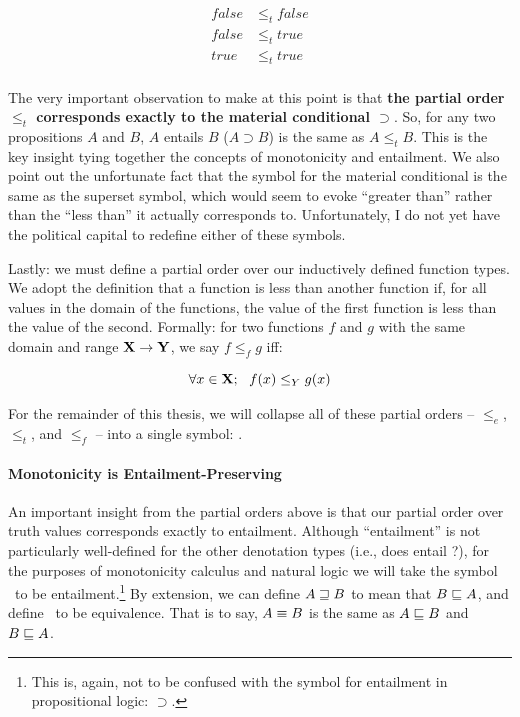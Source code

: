 \begin{align*}
  false &\leq_t false \\
  false &\leq_t true \\
  true &\leq_t true \\
\end{align*}

The very important observation to make at this point is that
  \textbf{the partial order $\leq_t$ corresponds exactly to the material conditional $\supset$}.
So, for any two propositions $A$ and $B$, $A$ entails $B$ ($A \supset B$) is the same
  as $A \leq_t B$.
This is the key insight tying together the concepts of monotonicity and entailment.
We also point out the unfortunate fact that the symbol for the material conditional
  is the same as the superset symbol, which would seem to evoke ``greater than'' rather
  than the ``less than'' it actually corresponds to.
Unfortunately, I do not yet have the political capital to redefine either of these
  symbols.

Lastly: we must define a partial order over our inductively defined function types.
We adopt the definition that a function is less than another function if, for all
  values in the domain of the functions, the value of the first function is less than
  the value of the second.
Formally: for two functions $f$ and $g$ with the same domain and range $\mathbf{X} \rightarrow \mathbf{Y}$,
  we say $f \leq_f g$ iff:

\begin{equation}
  \forall x \in \mathbf{X}; ~~ f(x) \leq_Y g(x)
\end{equation}

For the remainder of this thesis, we will collapse all of these partial orders
  -- $\leq_e$, $\leq_t$, and $\leq_f$ -- into
  a single symbol: \forward.



\paragraph{Monotonicity is Entailment-Preserving}
An important insight from the partial orders above is that our partial order
  over truth values corresponds exactly to entailment.
Although ``entailment'' is not particularly well-defined for the other denotation
  types (i.e., does  entail ?), for the purposes of monotonicity
  calculus and natural logic we will take the symbol \forward\ to be entailment.\footnote{
    This is, again, not to be confused with the symbol for entailment in propositional
    logic: $\supset$.
  }
By extension, we can define $A \sqsupseteq B$ to mean that $B \sqsubseteq A$, and define
  \equivalent\ to be equivalence.
That is to say, $A \equiv B$ is the same as $A \sqsubseteq B$ and $B \sqsubseteq A$.

